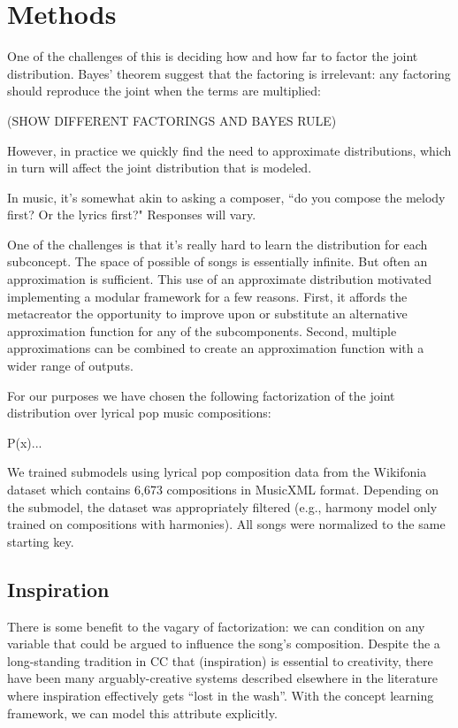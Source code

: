 \documentclass[letterpaper]{article}
\begin{document}
\section{Methods}

One of the challenges of this is deciding how and how far to factor the joint distribution. Bayes' theorem suggest that the factoring is irrelevant: any factoring should reproduce the joint when the terms are multiplied:

(SHOW DIFFERENT FACTORINGS AND BAYES RULE)

However, in practice we quickly find the need to approximate distributions, which in turn will affect the joint distribution that is modeled.

 In music, it's somewhat akin to asking a composer, ``do you compose the melody first? Or the lyrics first?" Responses will vary. 

One of the challenges is that it's really hard to learn the distribution for each subconcept. The space of possible of songs is essentially infinite. But often an approximation is sufficient. This use of an approximate distribution motivated implementing a modular framework for a few reasons. First, it affords the metacreator the opportunity to improve upon or substitute an alternative approximation function for any of the subcomponents. Second, multiple approximations can be combined to create an approximation function with a wider range of outputs.

For our purposes we have chosen the following factorization of the joint distribution over lyrical pop music compositions:

P(x)...

We trained submodels using lyrical pop composition data from the Wikifonia dataset which contains 6,673 compositions in MusicXML format. Depending on the submodel, the dataset was appropriately filtered (e.g., harmony model only trained on compositions with harmonies). All songs were normalized to the same starting key.

\subsection{Inspiration}

There is some benefit to the vagary of factorization: we can condition on any variable that could be argued to influence the song's composition. Despite the a long-standing tradition in CC that (inspiration) is essential to creativity, there have been many arguably-creative systems described elsewhere in the literature where inspiration effectively gets ``lost in the wash''. With the concept learning framework, we can model this attribute explicitly.
\end{document}
